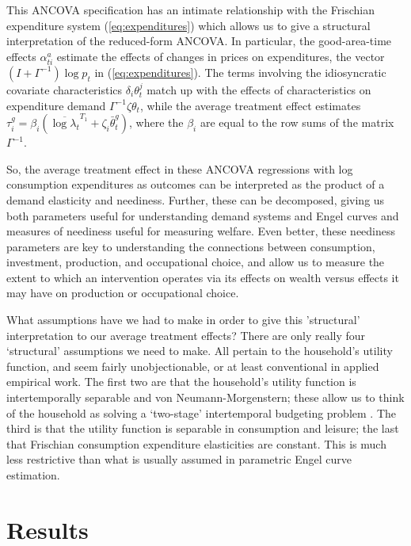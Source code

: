\documentclass[12pt,letterpaper]{article}
\newcommand{\Eq}[1]{(\ref{eq:#1})}
\begin{document}
This ANCOVA specification has an intimate relationship with the
Frischian expenditure system \Eq{expenditures} which allows us to give
a structural interpretation of the reduced-form ANCOVA.  In
particular, the good-area-time effects \(\alpha^a_{ti}\) estimate the
effects of changes in prices on expenditures, the vector
\((I + \Gamma^{-1})\log p_{t}\) in \Eq{expenditures}.  The terms involving
the idiosyncratic covariate characteristics \(\delta_i\theta^j_t\) match
up with the effects of characteristics on expenditure demand
\(\Gamma^{-1}\zeta\theta_t\), while the average treatment effect
estimates \(\tau^g_i=\beta_i(\overline{\log\lambda_t}^{T_1} +
\zeta_i\bar\theta^g_t)\), where the \(\beta_i\)
are equal to the row sums of the matrix \(\Gamma^{-1}\). 

So, the average treatment effect in these ANCOVA regressions with log
consumption expenditures as outcomes can be interpreted as the product
of a demand elasticity and neediness.  Further, these can be
decomposed, giving us both parameters useful for understanding demand
systems and Engel curves and measures of neediness useful for
measuring welfare.  Even better, these neediness parameters are key to
understanding the connections between consumption, investment,
production, and occupational choice, and allow us to measure
the extent to which an intervention operates via its effects on wealth
versus effects it may have on production or occupational choice.

What assumptions have we had to make in order to give this
'structural' interpretation to our average treatment effects?  There
are only really four `structural' assumptions we need to make.  All
pertain to the household's utility function, and seem fairly
unobjectionable, or at least conventional in applied empirical work.
The first two are that the household's utility function is
intertemporally separable and von Neumann-Morgenstern; these allow us
to think of the household as solving a `two-stage' intertemporal
budgeting problem \citep{gorman59}. The third is that the utility function is separable
in consumption and leisure; the last that Frischian consumption
expenditure elasticities are constant.  This is much less restrictive
than what is usually assumed in parametric Engel curve estimation.

\section{Results}
\label{sec:orgheadline14}
\end{document}
